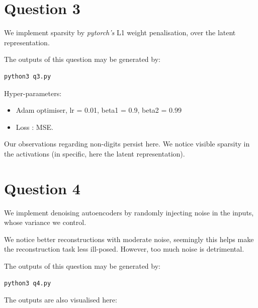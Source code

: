 \section{Question 3}

We implement sparsity by\textit{ pytorch's }L1 weight penalisation, over the latent representation.

The outputs of this question may be generated by:

\begin{lstlisting}
python3 q3.py
\end{lstlisting} 

Hyper-parameters:
\begin{itemize}
\item  Adam optimiser, lr = 0.01, beta1 = 0.9, beta2 = 0.99
\item  Loss : MSE.
\end{itemize}

Our observations regarding non-digits persist here. We notice visible sparsity in the activations (in specific, here the latent representation).

\section{Question 4}

We implement denoising autoencoders by randomly injecting noise in the inputs, whose variance we control.

We notice better reconstructions with moderate noise, seemingly this helps make the reconstruction task less ill-posed. However, too much noise is detrimental.

The outputs of this question may be generated by:

\begin{lstlisting}
python3 q4.py
\end{lstlisting} 

The outputs are also visualised here:

